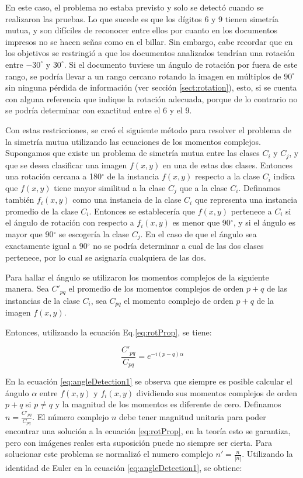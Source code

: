 \documentclass[a4paper, 11pt, oneside]{report}
\begin{document}
En este caso, el problema no estaba previsto y solo se detectó cuando se realizaron las pruebas. Lo que sucede es que los dígitos 6 y 9 tienen simetría mutua, y son difíciles de reconocer entre ellos por cuanto en los documentos impresos no se hacen señas como en el billar. Sin embargo, cabe recordar que en los objetivos se restringió a que los documentos analizados tendrían una rotación entre $-30^\circ$ y $30^\circ$. Si el documento tuviese un ángulo de rotación por fuera de este rango, se podría llevar a un rango cercano rotando la imagen en múltiplos de $90^\circ$ sin ninguna pérdida de información (ver sección \ref{sect:rotation}), esto, si se cuenta con alguna referencia que indique la rotación adecuada, porque de lo contrario no se podría determinar con exactitud entre el 6 y el 9.

Con estas restricciones, se creó el siguiente método para resolver el problema de la simetría mutua utilizando las ecuaciones de los momentos complejos. Supongamos que existe un problema de simetría mutua entre las clases $C_i$ y $C_j$, y que se desea clasificar una imagen $f(x,y)$ en una de estas dos clases. Entonces una rotación cercana a 180$^\circ$ de la instancia $f(x,y)$ respecto a la clase $C_i$ indica que $f(x,y)$ tiene mayor similitud a la clase $C_j$ que a la clase $C_i$. Definamos también $f_i(x,y)$ como una instancia de la clase $C_i$ que representa una instancia promedio de la clase $C_i$. Entonces se establecería que $f(x,y)$ pertenece a $C_i$ si el ángulo de rotación con respecto a $f_i(x,y)$ es menor que 90$^\circ$, y si el ángulo es mayor que 90$^\circ$ se escogería la clase $C_j$. En el caso de que el ángulo sea exactamente igual a 90$^\circ$ no se podría determinar a cual de las dos clases pertenece, por lo cual se asignaría  cualquiera de las dos.

Para hallar el ángulo se utilizaron los momentos complejos de la siguiente manera. Sea $C'_{pq}$ el promedio de los momentos complejos de orden $p+q$ de las instancias de la clase $C_i$, sea $C_{pq}$ el momento complejo de orden $p+q$ de la imagen $f(x,y)$.

Entonces, utilizando la ecuación Eq.\ref{eq:rotProp}, se tiene:

	\begin{equation}\label{eq:angleDetection1}
		\frac{C'_{pq}}{C_{pq}} = e^{-i(p-q)\alpha}
	\end{equation}

En la ecuación \ref{eq:angleDetection1} se observa que siempre es posible calcular el ángulo $\alpha$ entre $f(x,y)$ y $f_i(x,y)$ dividiendo sus momentos complejos de orden $p+q$ si $p \neq q$ y la magnitud de los momentos es diferente de cero. Definamos $n=\frac{C'_{pq}}{C_{pq}}$. El número complejo $n$ debe tener magnitud unitaria para poder encontrar una solución a la ecuación \ref{eq:rotProp}, en la teoría esto se garantiza, pero con imágenes reales esta suposición puede no siempre ser cierta. Para solucionar este problema se normalizó el numero complejo $n'=\frac{n}{|n|}$. Utilizando la identidad de Euler en la ecuación \ref{eq:angleDetection1}, se obtiene:
\end{document}
